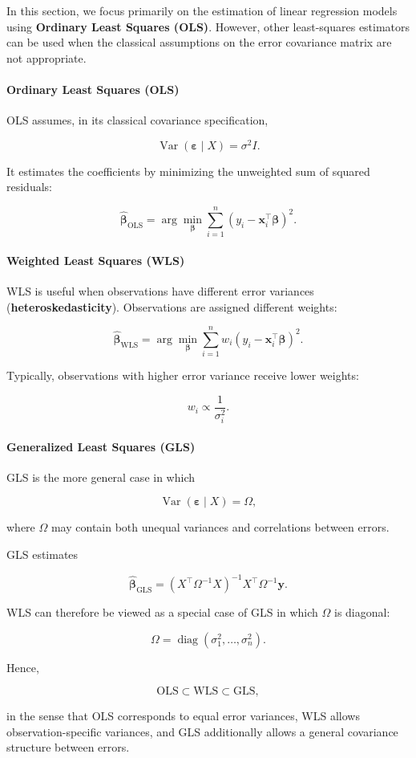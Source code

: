 In this section, we focus primarily on the estimation of linear regression
models using \textbf{Ordinary Least Squares (OLS)}. However, other
least-squares estimators can be used when the classical assumptions on the
error covariance matrix are not appropriate.

\paragraph{Ordinary Least Squares (OLS)}

OLS assumes, in its classical covariance specification,

\[
\operatorname{Var}(\boldsymbol{\varepsilon}\mid X)
=
\sigma^2 I.
\]

It estimates the coefficients by minimizing the unweighted sum of squared
residuals:

\[
\boxed{
\widehat{\boldsymbol{\beta}}_{\mathrm{OLS}}
=
\arg\min_{\boldsymbol{\beta}}
\sum_{i=1}^{n}
\left(
y_i-\mathbf{x}_i^\top\boldsymbol{\beta}
\right)^2.
}
\]

\paragraph{Weighted Least Squares (WLS)}

WLS is useful when observations have different error variances
(\textbf{heteroskedasticity}). Observations are assigned different weights:

\[
\boxed{
\widehat{\boldsymbol{\beta}}_{\mathrm{WLS}}
=
\arg\min_{\boldsymbol{\beta}}
\sum_{i=1}^{n}
w_i
\left(
y_i-\mathbf{x}_i^\top\boldsymbol{\beta}
\right)^2.
}
\]

Typically, observations with higher error variance receive lower weights:

\[
w_i\propto\frac{1}{\sigma_i^2}.
\]

\paragraph{Generalized Least Squares (GLS)}

GLS is the more general case in which

\[
\boxed{
\operatorname{Var}(\boldsymbol{\varepsilon}\mid X)
=
\Omega,
}
\]

where \(\Omega\) may contain both unequal variances and correlations between
errors.

GLS estimates

\[
\boxed{
\widehat{\boldsymbol{\beta}}_{\mathrm{GLS}}
=
(X^\top\Omega^{-1}X)^{-1}
X^\top\Omega^{-1}\mathbf{y}.
}
\]

WLS can therefore be viewed as a special case of GLS in which \(\Omega\) is
diagonal:

\[
\boxed{
\Omega
=
\operatorname{diag}
(\sigma_1^2,\ldots,\sigma_n^2).
}
\]

Hence,

\[
\boxed{
\text{OLS}
\subset
\text{WLS}
\subset
\text{GLS},
}
\]

in the sense that OLS corresponds to equal error variances, WLS allows
observation-specific variances, and GLS additionally allows a general
covariance structure between errors.